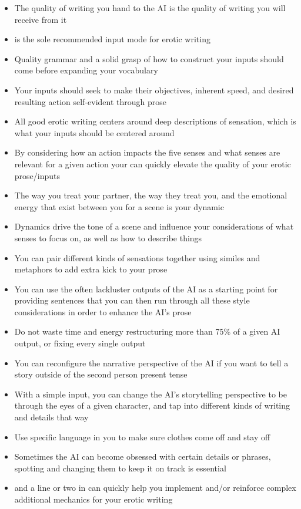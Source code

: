 ﻿\documentclass[Coomer-main.tex]{subfiles}
\begin{document}
\begin{itemize}
\item The quality of writing you hand to the AI is the quality of writing you will receive from it
\item \story is the sole recommended input mode for erotic writing
\item Quality grammar and a solid grasp of how to construct your inputs should come before expanding your vocabulary
\item Your inputs should seek to make their objectives, inherent speed, and desired resulting action self-evident through prose
\item All good erotic writing centers around deep descriptions of sensation, which is what your inputs should be centered around
\item By considering how an action impacts the five senses and what senses are relevant for a given action your can quickly elevate the quality of your erotic prose/inputs
\item The way you treat your partner, the way they treat you, and the emotional energy that exist between you for a scene is your dynamic
\item Dynamics drive the tone of a scene and influence your considerations of what senses to focus on, as well as how to describe things
\item You can pair different kinds of sensations together using similes and metaphors to add extra kick to your prose
\item You can use the often lackluster outputs of the AI as a starting point for providing sentences that you can then run through all these style considerations in order to enhance the AI's prose
\item Do not waste time and energy restructuring more than 75\% of a given AI output, or fixing every single output
\item You can reconfigure the narrative perspective of the AI if you want to tell a story outside of the second person present tense
\item With a simple input, you can change the AI's storytelling perspective to be through the eyes of a given character, and tap into different kinds of writing and details that way

\item Use specific language in you \rem to make sure clothes come off and stay off
\item Sometimes the AI can become obsessed with certain details or phrases, spotting and changing them to keep it on track is essential
\item \wi and a line or two in \rem can quickly help you implement and/or reinforce complex additional mechanics for your erotic writing

\end{itemize}
\end{document}

